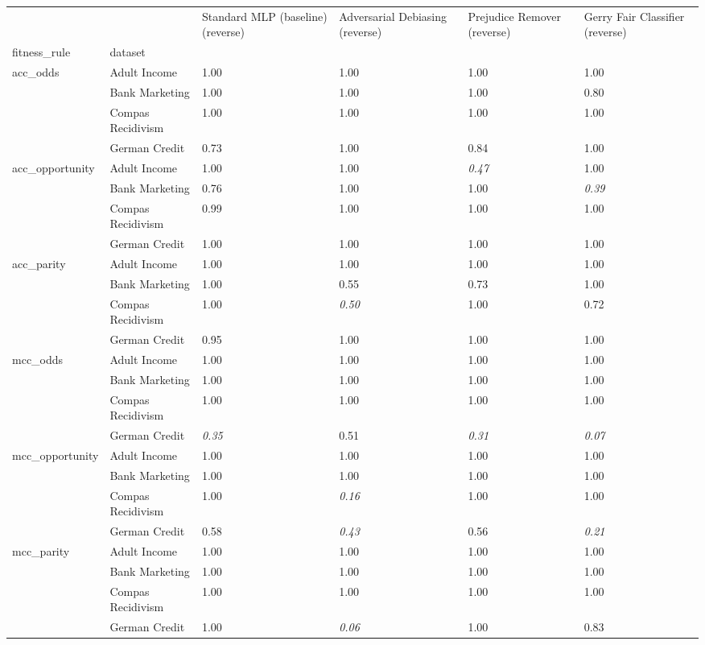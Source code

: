 \begin{tabular}{llllll}
\toprule
 &  & Standard MLP (baseline) (reverse) & Adversarial Debiasing (reverse) & Prejudice Remover (reverse) & Gerry Fair Classifier (reverse) \\
fitness_rule & dataset &  &  &  &  \\
\midrule
\multirow[t]{4}{*}{acc_odds} & Adult Income & 1.00 & 1.00 & 1.00 & 1.00 \\
 & Bank Marketing & 1.00 & 1.00 & 1.00 & 0.80 \\
 & Compas Recidivism & 1.00 & 1.00 & 1.00 & 1.00 \\
 & German Credit & 0.73 & 1.00 & 0.84 & 1.00 \\
\cline{1-6}
\multirow[t]{4}{*}{acc_opportunity} & Adult Income & 1.00 & 1.00 & \textit{0.47} & 1.00 \\
 & Bank Marketing & 0.76 & 1.00 & 1.00 & \textit{0.39} \\
 & Compas Recidivism & 0.99 & 1.00 & 1.00 & 1.00 \\
 & German Credit & 1.00 & 1.00 & 1.00 & 1.00 \\
\cline{1-6}
\multirow[t]{4}{*}{acc_parity} & Adult Income & 1.00 & 1.00 & 1.00 & 1.00 \\
 & Bank Marketing & 1.00 & 0.55 & 0.73 & 1.00 \\
 & Compas Recidivism & 1.00 & \textit{0.50} & 1.00 & 0.72 \\
 & German Credit & 0.95 & 1.00 & 1.00 & 1.00 \\
\cline{1-6}
\multirow[t]{4}{*}{mcc_odds} & Adult Income & 1.00 & 1.00 & 1.00 & 1.00 \\
 & Bank Marketing & 1.00 & 1.00 & 1.00 & 1.00 \\
 & Compas Recidivism & 1.00 & 1.00 & 1.00 & 1.00 \\
 & German Credit & \textit{0.35} & 0.51 & \textit{0.31} & \textit{0.07} \\
\cline{1-6}
\multirow[t]{4}{*}{mcc_opportunity} & Adult Income & 1.00 & 1.00 & 1.00 & 1.00 \\
 & Bank Marketing & 1.00 & 1.00 & 1.00 & 1.00 \\
 & Compas Recidivism & 1.00 & \textit{0.16} & 1.00 & 1.00 \\
 & German Credit & 0.58 & \textit{0.43} & 0.56 & \textit{0.21} \\
\cline{1-6}
\multirow[t]{4}{*}{mcc_parity} & Adult Income & 1.00 & 1.00 & 1.00 & 1.00 \\
 & Bank Marketing & 1.00 & 1.00 & 1.00 & 1.00 \\
 & Compas Recidivism & 1.00 & 1.00 & 1.00 & 1.00 \\
 & German Credit & 1.00 & \textit{0.06} & 1.00 & 0.83 \\
\cline{1-6}
\bottomrule
\end{tabular}
